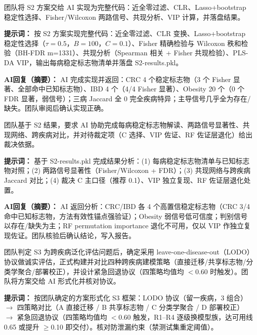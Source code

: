 \documentclass[12pt,a4paper]{ctexart}
\begin{document}
\begin{description}[leftmargin=*, itemindent=0pt, labelwidth=*, labelsep=0.5em]
\item[\textbf{交互记录 [AI-2-2] —— S2 建模实现}]

团队将 S2 方案交给 AI 实现为完整代码：近全零过滤、CLR、Lasso+bootstrap 稳定性选择、Fisher/Wilcoxon 两路信号、共现分析、VIP 计算，并落盘结果。

\textbf{提示词：} 按 S2 方案实现完整代码：近全零过滤、CLR 变换、Lasso+bootstrap 稳定性选择（$\tau=0.5$，$B=100$，$C=0.1$）、Fisher 精确检验与 Wilcoxon 秩和检验（BH-FDR m=1331）、共现分析（Spearman 相关 + Fisher 共现检验）、PLS-DA VIP，输出每病稳定标志物清单并落盘 S2-results.pkl。

\textbf{AI回复（摘要）：} AI 完成实现并返回：CRC 4 个稳定标志物（3 个 Fisher 显著、全部命中已知标志物）、IBD 4 个（4/4 Fisher 显著）、Obesity 20 个（0 个 FDR 显著，弱信号）；三病 Jaccard 全 0 完全疾病特异；主导信号几乎全为存在/缺失。团队审阅后确认实现正确。

\item[\textbf{交互记录 [AI-2-3] —— S2 结果分析}]

团队基于 S2 结果，要求 AI 协助完成每病稳定标志物解读、两路信号显著性、共现网络、跨疾病对比，并对待裁定项（C 选择、VIP 佐证、RF 佐证层退化）给出裁决依据。

\textbf{提示词：} 基于 S2-results.pkl 完成结果分析：(1) 每病稳定标志物清单与已知标志物对照；(2) 两路信号显著性（Fisher/Wilcoxon + FDR）；(3) 共现网络与跨疾病 Jaccard 对比；(4) 裁决 C 主口径（推荐 0.1）、VIP 独立复现、RF 佐证层退化处置。

\textbf{AI回复（摘要）：} AI 返回分析：CRC/IBD 各 4 个高置信稳定标志物（CRC 3/4 命中已知标志物，方法有效性锚点强验证）；Obesity 弱信号低可信度；判别信号以存在/缺失为主；RF permutation importance 退化不可用，仅以 VIP 作独立复现佐证。团队核验后确认结论，写入报告。

\item[\textbf{交互记录 [AI-3-1] —— S3 方案设计}]

团队判定 S3 为跨疾病泛化评估问题后，确定采用 leave-one-disease-out（LODO）协议做诚实评估，正式构建并对比四种跨疾病建模策略（直接迁移/共享标志物/分类学聚合/部署校正），并设计紧急回退协议（四策略均值均 $<$0.60 时触发）。团队将方案交给 AI 形式化并核对协议。

\textbf{提示词：} 按团队确定的方案形式化 S3 框架：LODO 协议（留一疾病，3 组合）$\to$ 四策略对比（A 直接迁移 / B 共享标志物 / C 分类学聚合 / D 部署校正）$\to$ 紧急回退协议（四策略均值均 $<$0.60 触发，R1--R4 逐级换模型族，达可用线 0.65 或提升 $\ge$0.10 即交付）。核对防泄漏约束（禁测试集重定阈值）。


\end{description}
\end{document}

